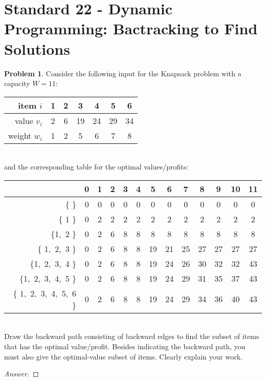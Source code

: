 \documentclass[11pt]{article}
\theoremstyle{definition}
\theoremstyle{definition}
\newtheorem{required}{Problem}
\theoremstyle{definition}
\begin{document}
\newpage
\section{Standard 22 - Dynamic Programming: Bactracking to Find Solutions}
\begin{required}
Consider the following input for the Knapsack problem with a capacity $W=11$:\\
\begin{center}
 \begin{tabular}{r|c|c|c|c|c|c}
        item $i$  & 1  & 2 &3 &4 &5 &6 \\
                \hline
        value $v_i$ &2 & 6& 19&24 &29 &34 \\
          \hline
        weight $w_i$ & 1 & 2  & 5& 6& 7& 8\\
                 \end{tabular}
\end{center}

\vspace{1mm}
\noindent \\ 
and the corresponding table for the optimal values/profits:\\
\begin{center}
 \begin{tabular}{r|c|c|c|c|c|c|c|c|c|c|c|c}
          & 0  & 1 &2 &3 &4&5&6&7&8&9&10&11 \\
                \hline
        \{  \}  &0 & 0& 0&0 &0 &0&0 & 0& 0&0 &0 &0 \\
          \hline
         \{ 1 \}  & 0 & 2  & 2& 2& 2& 2& 2  & 2& 2& 2& 2&2\\
          \hline
           \{1,~2  \}  & 0 & 2  & 6& 8& 8& 8& 8& 8& 8& 8& 8& 8\\
          \hline
           \{ 1,~2,~3 \}  & 0 & 2  & 6&8& 8& 19&21&25&27&27&27&27\\
          \hline
           \{1,~2,~3,~4  \}  & 0 & 2  & 6& 8& 8& 19&24&26&30&32&32&43\\
          \hline
           \{1,~2,~3,~4,~5  \}  & 0 & 2  & 6& 8& 8& 19&24&29&31&35&37&43\\
          \hline
           \{ 1,~2,~3,~4,~5,~6 \}  & 0 & 2  & 6& 8& 8& 19&24&29&34&36&40&43\\
          
          
                 \end{tabular}
\end{center}

\vspace{1mm}
\noindent \\ 
Draw the backward path consisting of backward edges to find the subset of items that has the optimal value/profit. Besides indicating the backward path, you must also give the optimal-value subset of items.
Clearly explain your work. 

\begin{proof}[Answer]
\end{proof}


\end{required}
\end{document}
